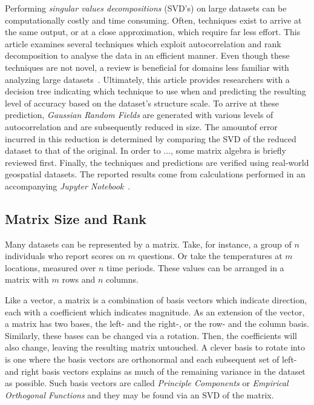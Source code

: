 \documentclass[ijgi,article,submit,moreauthors,pdftex,10pt,a4paper]{Definitions/mdpi}
\begin{document}
Performing \textit{singular values decompositions} (SVD's) on large datasets can be computationally costly and time consuming. Often, techniques exist to arrive at the same output, or at a close approximation, which require far less effort. This article examines several techniques which exploit autocorrelation and rank decomposition to analyse the data in an efficient manner. Even though these techniques are not novel, a review is beneficial for domains less familiar with analyzing large datasets~\cite{Golub1970, Bjorck1973, Chan1982}. Ultimately, this article provides researchers with a decision tree indicating which technique to use when and predicting the resulting level of accuracy based on the dataset's structure scale. To arrive at these prediction, \textit{Gaussian Random Fields} are generated with various levels of autocorrelation and are subsequently reduced in size. The amountof error incurred in this reduction is determined by comparing the SVD of the reduced dataset to that of the original. In order to ..., some matrix algebra is briefly reviewed first. Finally, the techniques and predictions are verified using real-world geospatial datasets. The reported results come from calculations performed in an accompanying \textit{Jupyter Notebook}~\cite{Bogaardt2018}.

\subsection{Matrix Size and Rank}
\label{sec:Introduction/Matrix Size and Rank}

Many datasets can be represented by a matrix. Take, for instance, a group of $n$ individuals who report scores on $m$ questions. Or take the temperatures at $m$ locations, measured over $n$ time periods. These values can be arranged in a matrix with $m$ rows and $n$ columns.

Like a vector, a matrix is a combination of basis vectors which indicate direction, each with a coefficient which indicates magnitude. As an extension of the vector, a matrix has two bases, the left- and the right-, or the row- and the column basis. Similarly, these bases can be changed via a rotation. Then, the coefficients will also change, leaving the resulting matrix untouched. A clever basis to rotate into is one where the basis vectors are orthonormal and each subsequent set of left- and right basis vectors explains as much of the remaining variance in the dataset as possible. Such basis vectors are called \textit{Principle Components} or \textit{Empirical Orthogonal Functions} and they may be found via an SVD of the matrix.
\end{document}
